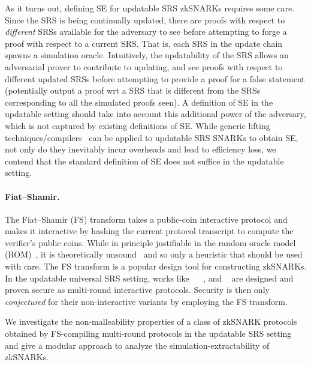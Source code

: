 As it turns out, defining SE for updatable SRS zkSNARKs requires some care. 
Since the SRS is being continually updated, there are proofs with respect to \textit{different} SRSs available for the adversary to see before attempting to forge a proof with respect to a current SRS. 
That is, each SRS in the update chain spawns a simulation oracle. Intuitively, the updatability of the SRS allows an adversarial prover to contribute to updating, and see proofs with respect to different updated SRSs before attempting to provide a proof for a false statement (potentially output a proof wrt a SRS that is different from the SRSs corresponding to all the simulated proofs seen). A definition of SE in the updatable setting should take into account this additional power of the adversary, which is not captured by existing definitions of SE. 
While generic lifting techniques/compilers~\cite{EPRINT:KZMQCP15,CCS:AbdRamSla20} can be applied to updatable SRS SNARKs to obtain SE, not only do they inevitably incur overheads and lead to efficiency loss, we contend that the standard definition of SE does not suffice in the updatable setting.


\paragraph{Fiat--Shamir.}
The Fiat--Shamir (FS) transform takes a public-coin interactive protocol and
makes it interactive by hashing the current protocol transcript to compute the
verifier's public coins. While in principle justifiable in the random oracle
model (ROM)~\cite{CCS:BelRog93}, it is theoretically
unsound~\cite{FOCS:GolKal03} and so only a heuristic that should be used with
care.
%
The FS transform is a popular design tool for constructing
zkSNARKs. In the updatable universal SRS setting, works like \sonic{}~\cite{CCS:MBKM19}
\plonk{}~\cite{EPRINT:GabWilCio19}, and \marlin~\cite{EC:CHMMVW20} are designed
and proven secure as multi-round interactive protocols. Security is then only
\emph{conjectured} for their non-interactive variants by employing the FS
transform.

We investigate the non-malleability properties of a class of zkSNARK protocols obtained by FS-compiling multi-round protocols in the updatable SRS setting and give a modular approach to analyze the simulation-extractability of zkSNARKs.
